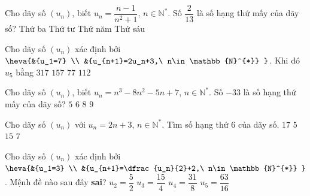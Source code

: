 \begin{ex}%
	Cho dãy số $\left(u_n \right)$, biết $u_n=\dfrac{n-1}{n^2+1}$, $n\in \mathbb{N}^{*}$. Số $\dfrac{2}{13}$ là số  hạng thứ mấy của dãy số?
	\choice 
		 {Thứ ba}
		 {Thứ tư}
		{\True Thứ năm} 
		{Thứ sáu} 
\end{ex}

\begin{ex}%
	Cho  dãy số $\left(u_n \right)$ xác định bởi $\heva{&{u_1=7} \\
	&{u_{n+1}=2u_n+3,\  n\in\mathbb{N}^{*}}
	}$. Khi đó  $u_5$ bằng
	 \choice
		 {$317$}
		{\True $157$} 
		{$77$} 
		 {$112$}
\end{ex}

\begin{ex}%
	Cho dãy số $\left(u_n \right)$, biết $u_n=n^3-8n^2-5n+7$, $n\in  \mathbb{N}^{*}$. Số $-33$ là số hạng thứ mấy của dãy số?
	 \choice
		{$5$} 
		 {$6$}
		{\True $8$} 
		{$9$} 
\end{ex}

\begin{ex}%
	Cho dãy số $\left(u_n  \right)$ với $u_n=2n+3$, $n\in\mathbb{N}^*$. Tìm số hạng thứ $6$ của dãy số.
	 \choice
		{$17$} 
		 {$5$}
		 {\True $15$}
		{$7$} 
\end{ex}

\begin{ex}%
	Cho dãy số $\left(u_n \right)$ xác định bởi $\heva{&{u_1=3} \\ 
	&{u_{n+1}=\dfrac{u_n}{2}+2,\ n\in\mathbb{N}^{*}} 
	}$. Mệnh  đề nào sau đây \textbf{sai}?
	 \choice
		 {\True $u_2=\dfrac{5}{2}$}
		{$u_3=\dfrac{15}{4}$} 
		 {$u_4=\dfrac{31}{8}$}
		 {$u_5=\dfrac{63}{16}$}
\end{ex}

